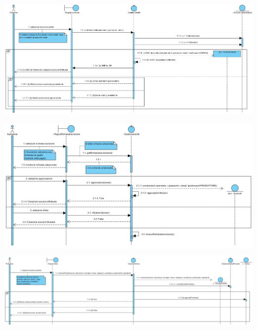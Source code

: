 \begin{landscape}
\begin{center}
			\includegraphics[width=\linewidth]{assets/visualParadigm/sequenza/iscrizioneUtente}
\end{center}
\end{landscape}

\begin{landscape}
\begin{center}
			\includegraphics[width=\linewidth]{assets/visualParadigm/sequenza/approvazioneIscrizione}
\end{center}
\end{landscape}

\begin{landscape}
\begin{center}
			\includegraphics[width=\linewidth]{assets/visualParadigm/sequenza/inserimentoSchedaProdotto}
\end{center}
\end{landscape}

